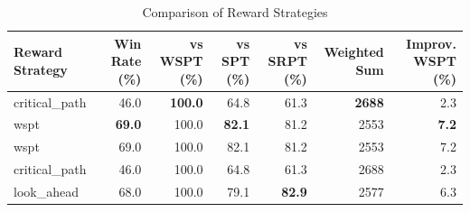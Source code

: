 \begin{table}[htbp]%
\centering%
\begin{tabular}{lrrrrrr}%
\toprule%
\textbf{Reward Strategy}&\textbf{Win Rate (\%)}&\textbf{vs WSPT (\%)}&\textbf{vs SPT (\%)}&\textbf{vs SRPT (\%)}&\textbf{Weighted Sum}&\textbf{Improv. WSPT (\%)}\\%
\midrule%
critical_path&46.0&\textbf{100.0}&64.8&61.3&\textbf{2688}&2.3\\%
wspt&\textbf{69.0}&100.0&\textbf{82.1}&81.2&2553&\textbf{7.2}\\%
wspt&69.0&100.0&82.1&81.2&2553&7.2\\%
critical_path&46.0&100.0&64.8&61.3&2688&2.3\\%
look_ahead&68.0&100.0&79.1&\textbf{82.9}&2577&6.3\\%
\bottomrule%
\end{tabular}%
\caption{Comparison of Reward Strategies}%
\label{tab:rewards}%
\end{table}
